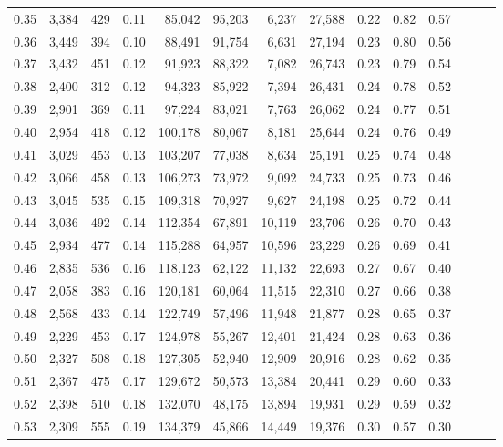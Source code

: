 \begin{tabular}{rrrrrrrrrrrrrr}
0.35 &  3,384 &  429 &  0.11 &   85,042 &   95,203 &   6,237 &  27,588 &  0.22 &  0.82 &      0.57 \\
0.36 &  3,449 &  394 &  0.10 &   88,491 &   91,754 &   6,631 &  27,194 &  0.23 &  0.80 &      0.56 \\
0.37 &  3,432 &  451 &  0.12 &   91,923 &   88,322 &   7,082 &  26,743 &  0.23 &  0.79 &      0.54 \\
0.38 &  2,400 &  312 &  0.12 &   94,323 &   85,922 &   7,394 &  26,431 &  0.24 &  0.78 &      0.52 \\
0.39 &  2,901 &  369 &  0.11 &   97,224 &   83,021 &   7,763 &  26,062 &  0.24 &  0.77 &      0.51 \\
0.40 &  2,954 &  418 &  0.12 &  100,178 &   80,067 &   8,181 &  25,644 &  0.24 &  0.76 &      0.49 \\
0.41 &  3,029 &  453 &  0.13 &  103,207 &   77,038 &   8,634 &  25,191 &  0.25 &  0.74 &      0.48 \\
0.42 &  3,066 &  458 &  0.13 &  106,273 &   73,972 &   9,092 &  24,733 &  0.25 &  0.73 &      0.46 \\
0.43 &  3,045 &  535 &  0.15 &  109,318 &   70,927 &   9,627 &  24,198 &  0.25 &  0.72 &      0.44 \\
0.44 &  3,036 &  492 &  0.14 &  112,354 &   67,891 &  10,119 &  23,706 &  0.26 &  0.70 &      0.43 \\
0.45 &  2,934 &  477 &  0.14 &  115,288 &   64,957 &  10,596 &  23,229 &  0.26 &  0.69 &      0.41 \\
0.46 &  2,835 &  536 &  0.16 &  118,123 &   62,122 &  11,132 &  22,693 &  0.27 &  0.67 &      0.40 \\
0.47 &  2,058 &  383 &  0.16 &  120,181 &   60,064 &  11,515 &  22,310 &  0.27 &  0.66 &      0.38 \\
0.48 &  2,568 &  433 &  0.14 &  122,749 &   57,496 &  11,948 &  21,877 &  0.28 &  0.65 &      0.37 \\
0.49 &  2,229 &  453 &  0.17 &  124,978 &   55,267 &  12,401 &  21,424 &  0.28 &  0.63 &      0.36 \\
0.50 &  2,327 &  508 &  0.18 &  127,305 &   52,940 &  12,909 &  20,916 &  0.28 &  0.62 &      0.35 \\
0.51 &  2,367 &  475 &  0.17 &  129,672 &   50,573 &  13,384 &  20,441 &  0.29 &  0.60 &      0.33 \\
0.52 &  2,398 &  510 &  0.18 &  132,070 &   48,175 &  13,894 &  19,931 &  0.29 &  0.59 &      0.32 \\
0.53 &  2,309 &  555 &  0.19 &  134,379 &   45,866 &  14,449 &  19,376 &  0.30 &  0.57 &      0.30 \\

\end{tabular}
